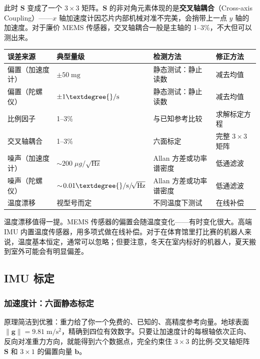 此时 $\mathbf{S}$ 变成了一个 $3 \times 3$ 矩阵。$\mathbf{S}$ 的非对角元素体现的是\textbf{交叉轴耦合}（Cross-axis Coupling）——$x$ 轴加速度计因芯片内部机械对准不完美，会捎带上一点 $y$ 轴的加速度。对于廉价 MEMS 传感器，交叉轴耦合一般是主轴的 1--3\%，不大但可以测出来。

\begin{center}
\begin{tabular}{llll}
\toprule
\textbf{误差来源} & \textbf{典型量级} & \textbf{检测方法} & \textbf{修正方法} \\
\midrule
偏置（加速度计） & $\pm 50\;\mathrm{mg}$ & 静态测试：静止读数 & 减去均值 \\
偏置（陀螺仪） & $\pm 1\textdegree{}/\mathrm{s}$ & 静态测试：静止读数 & 减去均值 \\
比例因子 & 1--3\% & 与已知参考比较 & 求解标定方程 \\
交叉轴耦合 & 1--3\% & 六面标定 & 完整 $3\times3$ 矩阵 \\
噪声（加速度计） & $\sim\!200\;\mu g/\!\sqrt{\mathrm{Hz}}$ & Allan 方差或功率谱密度 & 低通滤波 \\
噪声（陀螺仪） & $\sim\!0.01\textdegree{}/\mathrm{s}/\!\sqrt{\mathrm{Hz}}$ & Allan 方差或功率谱密度 & 低通滤波 \\
温度漂移 & 视型号而定 & 不同温度下测试 & 在线补偿 \\
\bottomrule
\end{tabular}
\end{center}

温度漂移值得一提。MEMS 传感器的偏置会随温度变化——有时变化很大。高端 IMU 内置温度传感器，用多项式做在线补偿。对于在体育馆里打比赛的机器人来说，温度基本恒定，通常可以忽略；但要注意，冬天在室内标好的机器人，夏天搬到室外可能会有明显偏差。

\subsection{IMU 标定}

\subsubsection{加速度计：六面静态标定}

原理简洁到优雅：重力给了你一个免费的、已知的、高精度参考向量。地球表面 $\|\mathbf{g}\| = 9.81\;\mathrm{m/s^2}$，精确到四位有效数字。只要让加速度计的每根轴依次正向、反向对准重力方向，就能得到六个数据点，完全约束住 $3 \times 3$ 的比例-交叉轴矩阵 $\mathbf{S}$ 和 $3 \times 1$ 的偏置向量 $\mathbf{b}$。

